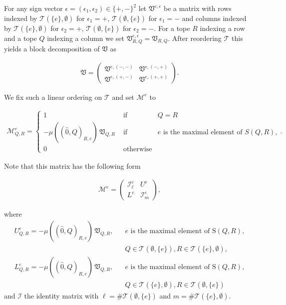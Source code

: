 \documentclass[12pt]{amsart}
\def\Var{{\mathfrak V}}
\def\Tscr{{\mathcal T}}
\theoremstyle{plain}
\numberwithin{Lemma}{\DefaultNumberTheoremWithin}
\numberwithin{Claim}{\DefaultNumberTheoremWithin}
\numberwithin{Theorem}{\DefaultNumberTheoremWithin}
\numberwithin{Corollary}{\DefaultNumberTheoremWithin}
\numberwithin{Proposition}{\DefaultNumberTheoremWithin}
\numberwithin{Conjecture}{\DefaultNumberTheoremWithin}
\numberwithin{Situation}{\DefaultNumberTheoremWithin}
\numberwithin{Note}{\DefaultNumberTheoremWithin}
\theoremstyle{definition}
\numberwithin{Definition}{\DefaultNumberTheoremWithin}
\theoremstyle{definition}
\numberwithin{Question}{\DefaultNumberTheoremWithin}
\theoremstyle{definition}
\numberwithin{Problem}{\DefaultNumberTheoremWithin}
\theoremstyle{remark} \newtheorem{Remark}{Remark}
\numberwithin{Remark}{\DefaultNumberTheoremWithin}
\theoremstyle{remark}
\numberwithin{Example}{\DefaultNumberTheoremWithin}
\numberwithin{Case}{Lemma}
\numberwithin{Step}{Lemma}
\begin{document}
For any sign vector $\epsilon =
(\epsilon_1,\epsilon_2) \in \{ +,-\}^2$ let $\Var^{e,\epsilon}$
be a matrix with rows indexed by $\Tscr(\{e\} ,\emptyset)$ for $\epsilon_1 =+$,
$\Tscr(\emptyset, \{e\})$ for $\epsilon_1 = -$ and columns indexed
by $\Tscr(\{e\},\emptyset)$ for $\epsilon_2 = +$, $\Tscr(\emptyset, \{e\})$ for
$\epsilon_2 = -$. For a tope $R$ indexing a row and
a tope $Q$ indexing a column we set $\Var^{e,\epsilon}_{R,Q} = \Var_{R,Q}$. After reordering $\Tscr$ this yields a block decomposition of $\Var$ as

\begin{align}\label{equ:blocks}
\Var = \left( 
       \begin{array}{cc} 
         \Var^{e,(-,-)} & \Var^{e,(-,+)}    \\ 
         \Var^{e,(+,-)} & \Var^{e,(+,+)}  
       \end{array}
      \right) .
\end{align}

We fix such a linear ordering on $\Tscr$ and set $\mathcal{M}^e$ to 

\begin{align*}
\mathcal{M}^e_{Q,R} = \left\{ 
	    \begin{array}{ccc} 
		1 & \mbox{~if~} & Q = R \\ 
	       -\mu((\hat{0},Q)_{R,e})\, \Var_{Q,R} & \mbox{~if~} & e \text{ is the maximal element of }S(Q,R),  \\
		0 & \mbox{~otherwise} & 
	    \end{array} \right. . 
\end{align*}
	  
Note that this matrix has the following form

\begin{align*}
\mathcal{M}^e = 
      \left(  \begin{array}{cc} 
         \mathcal{I}^e_{\ell}  & U^e  \\ 
         L^e  & \mathcal{I}^e_{m} 
       \end{array}
      \right) ,
\end{align*}
      
where 
\begin{align*}
U^e_{Q,R} = -\mu((\hat{0},Q)_{R,e}) \, \Var_{Q,R},\;\;\;  &e \text{ is the maximal element of S}(Q,R), \\  &Q \in \Tscr(\emptyset,\{e\}), R \in \Tscr(\{e\},\emptyset) , \\
L^e_{Q,R} = -\mu((\hat{0},Q)_{R,e})\, \Var_{Q,R},\;\;\;  &e \text{ is the maximal element of S}(Q,R), \\ & Q \in \Tscr(\{e\},\emptyset), R \in \Tscr(\emptyset, \{e\})
\end{align*}
and $\mathcal{I}$ the identity matrix with $\ell=\#\Tscr(\emptyset,\{e\})$ and $m = \# \Tscr(\{e\},\emptyset)$. 
\end{document}
